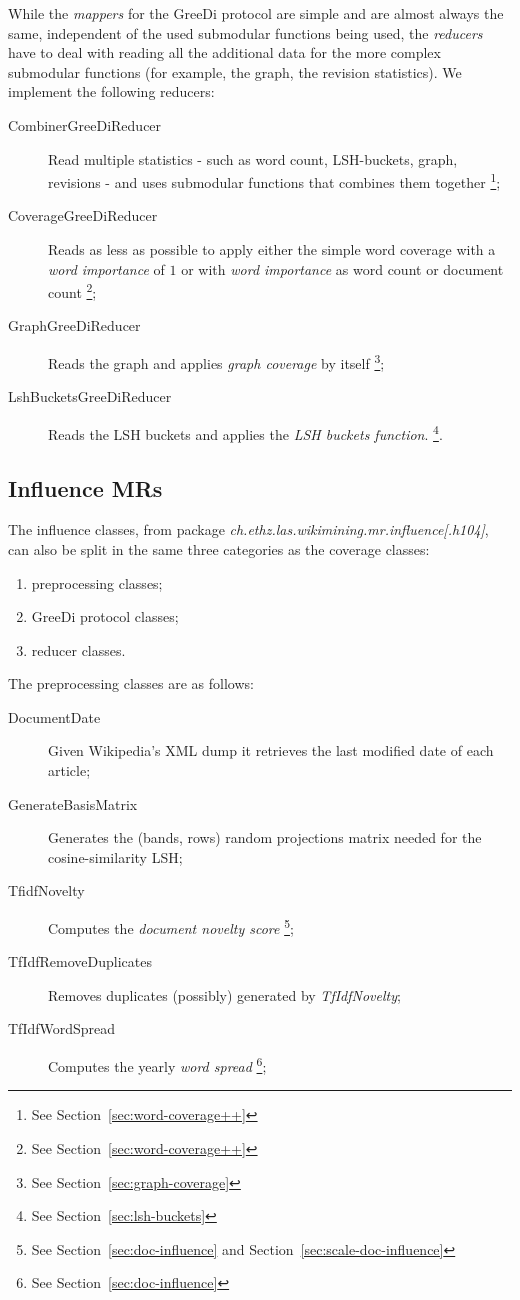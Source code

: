 While the \emph{mappers} for the GreeDi protocol are simple and are almost
always the same, independent of the used submodular functions being used, the
\emph{reducers} have to deal with reading all the additional data for the more
complex submodular functions (for example, the graph, the revision statistics).
We implement the following reducers:
\begin{description}
  \item[CombinerGreeDiReducer] Read multiple statistics - such as word count,
  LSH-buckets, graph, revisions - and uses submodular functions that combines
  them together \footnote{See Section~\vref{sec:word-coverage++}};
  \item[CoverageGreeDiReducer] Reads as less as possible to apply either the
  simple word coverage with a \emph{word importance} of \(1\) or with
  \emph{word importance} as word count or document count \footnote{See
  Section~\vref{sec:word-coverage++}};
  \item[GraphGreeDiReducer] Reads the graph and applies \emph{graph coverage}
  by itself \footnote{See Section~\vref{sec:graph-coverage}};
  \item[LshBucketsGreeDiReducer] Reads the \ac{LSH} buckets and applies the
  \emph{\ac{LSH} buckets function}. \footnote{See
  Section~\vref{sec:lsh-buckets}}.
\end{description}

\subsection{Influence \aclp{MR}}

The influence classes, from package
\emph{ch.ethz.las.wikimining.mr.influence[.h104]}, can also be split in the same
three categories as the coverage classes:
\begin{enumerate}
  \item preprocessing classes;
  \item GreeDi protocol classes;
  \item reducer classes.
\end{enumerate}

The preprocessing classes are as follows:
\begin{description}
  \item[DocumentDate] Given Wikipedia's \ac{XML} dump it retrieves the last
  modified date of each article;
  \item[GenerateBasisMatrix] Generates the (bands, rows) random projections
  matrix needed for the cosine-similarity \ac{LSH};
  \item[TfidfNovelty] Computes the \emph{document novelty score} \footnote{See
  Section~\vref{sec:doc-influence} and Section~\vref{sec:scale-doc-influence}};
  \item[TfIdfRemoveDuplicates] Removes duplicates (possibly) generated by
    \emph{TfIdfNovelty};
  \item[TfIdfWordSpread] Computes the yearly \emph{word spread} \footnote{See
    Section~\vref{sec:doc-influence}};
\end{description}

